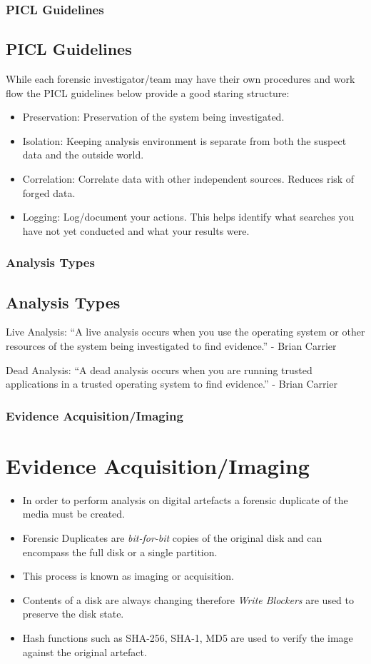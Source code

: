 \documentclass{beamer}
\begin{document}
\begin{frame}
	\frametitle{PICL Guidelines}
	\subsection{PICL Guidelines}
	While each forensic investigator/team may have their own procedures and work flow the PICL guidelines below provide a good staring structure:
	\begin{itemize}
		\item Preservation:	 Preservation of the system being investigated.
		\item Isolation:	 Keeping analysis environment is separate from both the suspect data and the outside world.
		\item Correlation:	 Correlate data with other independent sources. Reduces risk of forged data.
		\item Logging:	 Log/document your actions. This helps identify what searches you have not yet conducted and what your results were.
	\end{itemize}
\end{frame}

\begin{frame}
	\frametitle{Analysis Types}
	\subsection{Analysis Types}
	\begin{block}{Live Analysis:}
		``A live analysis occurs when you use the operating system or other resources of the system being investigated to find evidence.'' - Brian Carrier
	\end{block}

	\begin{block}{Dead Analysis:}
		``A dead analysis occurs when you are running trusted applications in a trusted operating system to find evidence.'' - Brian Carrier
	\end{block}
\end{frame}

\begin{frame}
	\frametitle{Evidence Acquisition/Imaging}
	\section{Evidence Acquisition/Imaging}
	\begin{itemize}
		\item In order to perform analysis on digital artefacts a forensic duplicate of the media must be created.
		\item Forensic Duplicates are \emph{bit-for-bit} copies of the original disk and can encompass the full disk or a single partition. 
		\item This process is known as imaging or acquisition.
		\item Contents of a disk are always changing therefore \emph{Write Blockers} are used to preserve the disk state.
		\item Hash functions such as SHA-256, SHA-1, MD5 are used to verify the image against the original artefact.
	\end{itemize}
\end{frame}
\end{document}
